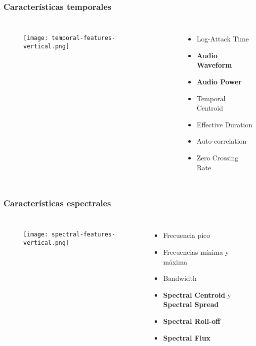 \begin{frame}
    \frametitle{Características temporales}

    \begin{columns}

        \begin{figure}[!h]
            \centering
            \texttt{[image: temporal-features-vertical.png]}
        \end{figure}


        \begin{itemize}
            \item<2-> Log-Attack Time
            \item<3-> \textbf{Audio Waveform}
            \item<4-> \textbf{Audio Power}
            \item<5-> Temporal Centroid
            \item<6-> Effective Duration
            \item<7-> Auto-correlation
            \item<8-> Zero Crossing Rate
        \end{itemize}

    \end{columns}
\end{frame}

\begin{frame}
    \frametitle{Características espectrales}

    \begin{columns}

        \begin{figure}[!h]
            \centering
            \texttt{[image: spectral-features-vertical.png]}
        \end{figure}


        \begin{itemize}
            \item<2-> Frecuencia pico
            \item<3-> Frecuencias mínima y máxima
            \item<4-> Bandwidth
            \item<5-> \textbf{Spectral Centroid} y \textbf{Spectral Spread}
            \item<6-> \textbf{Spectral Roll-off}
            \item<7-> \textbf{Spectral Flux}
        \end{itemize}

    \end{columns}
\end{frame}


